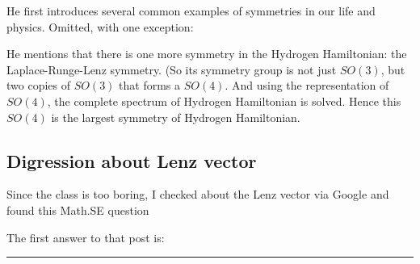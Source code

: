 

He first introduces several common examples of symmetries in our life and
physics. Omitted, with one exception:

He mentions that there is one more symmetry in the Hydrogen 
Hamiltonian: the Laplace-Runge-Lenz symmetry. (So its symmetry 
group is not just $SO(3)$, but two copies of $SO(3)$ that forms a $SO(4)$.
And using the representation of $SO(4)$, the complete spectrum of
Hydrogen Hamiltonian is solved. Hence this $SO(4)$ is the largest
symmetry of Hydrogen Hamiltonian.

    \subsection{Digression about Lenz vector}
    \label{sec:Digression_about_Lenz_vector}
    Since the class is too boring, I checked about the Lenz vector via
    Google and found this Math.SE question \cite{math.se_1_lenz_vector}

    The first answer to that post is:

    \begin{center}\noindent\rule{8cm}{0.4pt}\end{center}

